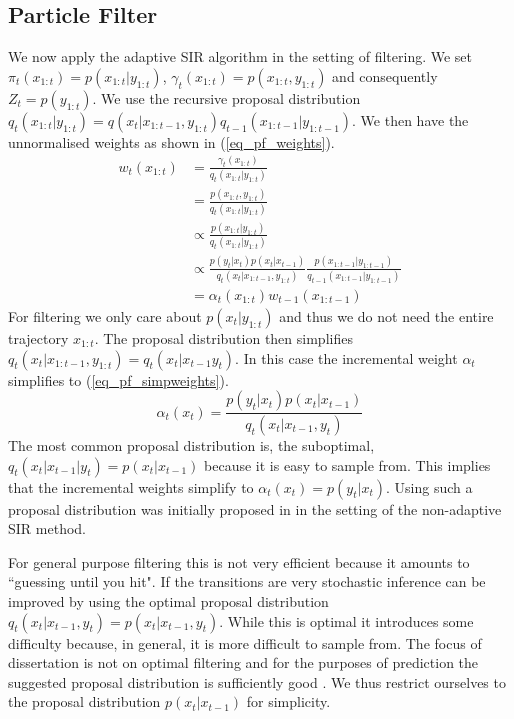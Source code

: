 \documentclass[../masters.tex]{subfiles}
\begin{document}
\subsection{Particle Filter}
We now apply the adaptive SIR algorithm in the setting of filtering. We set $\pi_t(x_{1:t}) = p(x_{1:t}|y_{1:t})$, $\gamma_t(x_{1:t}) = p(x_{1:t}, y_{1:t})$ and consequently $Z_t = p(y_{1:t})$. We use the recursive proposal distribution $q_t(x_{1:t}|y_{1:t}) = q(x_t|x_{1:t-1}, y_{1:t})q_{t-1}(x_{1:t-1}|y_{1:t-1})$. We then have the unnormalised weights as shown in (\ref{eq_pf_weights}).
\begin{equation}
\begin{aligned}
w_t(x_{1:t}) &= \frac{\gamma_t(x_{1:t})}{q_t(x_{1:t}|y_{1:t})} \\
&= \frac{p(x_{1:t}, y_{1:t})}{q_t(x_{1:t}|y_{1:t})} \\
&\propto \frac{p(x_{1:t}| y_{1:t})}{q_t(x_{1:t}|y_{1:t})} \\
&\propto \frac{p(y_t|x_t)p(x_t|x_{t-1})}{q_t(x_t|x_{1:t-1}, y_{1:t})}\frac{p(x_{1:t-1}| y_{1:t-1})}{q_{t-1}(x_{1:t-1}|y_{1:t-1})} \\
&= \alpha_t(x_{1:t})w_{t-1}(x_{1:t-1})
\end{aligned}
\label{eq_pf_weights}
\end{equation}
For filtering we only care about $p(x_t|y_{1:t})$ and thus we do not need the entire trajectory $x_{1:t}$. The proposal distribution then simplifies $q_t(x_t|x_{1:t-1}, y_{1:t}) = q_t(x_{t}|x_{t-1}y_{t})$. In this case the incremental weight $\alpha_t$ simplifies to (\ref{eq_pf_simpweights}).
\begin{equation}
\alpha_t(x_t) = \frac{p(y_t|x_t)p(x_t|x_{t-1})}{q_t(x_t|x_{t-1}, y_{t})} 
\label{eq_pf_simpweights}
\end{equation}
The most common proposal distribution is, the suboptimal, $q_t(x_t|x_{t-1}|y_t) = p(x_t|x_{t-1})$ because it is easy to sample from. This implies that the incremental weights simplify to $\alpha_t(x_t) = p(y_t|x_t)$. Using such a proposal distribution was initially proposed in \cite{gordon} in the setting of the non-adaptive SIR method. 

For general purpose filtering this is not very efficient because it amounts to ``guessing until you hit". If the transitions are very stochastic inference can be improved by using the optimal proposal distribution $q_t(x_t|x_{t-1}, y_t) = p(x_t|x_{t-1}, y_t)$. While this is optimal it introduces some difficulty because, in general, it is more difficult to sample from. The focus of dissertation is not on optimal filtering and for the purposes of prediction the suggested proposal distribution is sufficiently good \cite{murphy1}. We thus restrict ourselves to the proposal distribution $p(x_t|x_{t-1})$ for simplicity.
\end{document}
